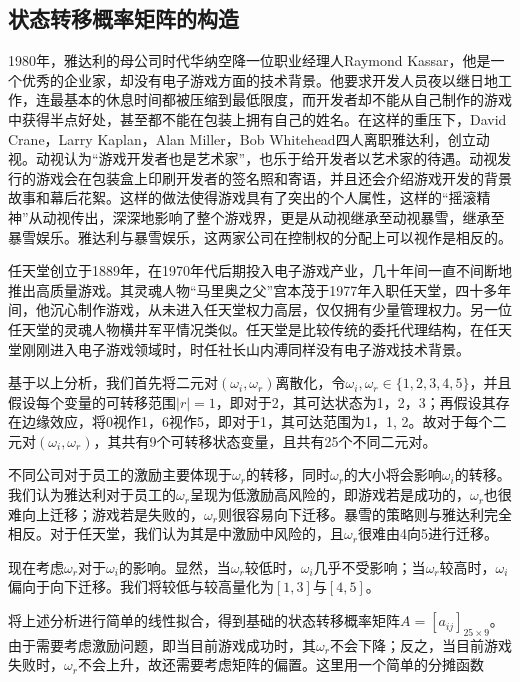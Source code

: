 \documentclass[hyperref]{ctexart}
\begin{document}
\begin{multicols}{2}
	\subsection{状态转移概率矩阵的构造}
    1980年，雅达利的母公司时代华纳空降一位职业经理人Raymond Kassar，他是一个优秀的企业家，却没有电子游戏方面的技术背景。他要求开发人员夜以继日地工作，连最基本的休息时间都被压缩到最低限度，而开发者却不能从自己制作的游戏中获得半点好处，甚至都不能在包装上拥有自己的姓名。在这样的重压下，David Crane，Larry Kaplan，Alan Miller，Bob Whitehead四人离职雅达利，创立动视。动视认为“游戏开发者也是艺术家”，也乐于给开发者以艺术家的待遇。动视发行的游戏会在包装盒上印刷开发者的签名照和寄语，并且还会介绍游戏开发的背景故事和幕后花絮。这样的做法使得游戏具有了突出的个人属性，这样的“摇滚精神”从动视传出，深深地影响了整个游戏界，更是从动视继承至动视暴雪，继承至暴雪娱乐。雅达利与暴雪娱乐，这两家公司在控制权的分配上可以视作是相反的。
    \par
    任天堂创立于1889年，在1970年代后期投入电子游戏产业，几十年间一直不间断地推出高质量游戏。其灵魂人物“马里奥之父”宫本茂于1977年入职任天堂，四十多年间，他沉心制作游戏，从未进入任天堂权力高层，仅仅拥有少量管理权力。另一位任天堂的灵魂人物横井军平情况类似。任天堂是比较传统的委托代理结构，在任天堂刚刚进入电子游戏领域时，时任社长山内溥同样没有电子游戏技术背景。
    \par
    基于以上分析，我们首先将二元对$(\omega_i, \omega_r)$离散化，令$\omega_i , \omega_r \in \{1,2,3,4,5\} $，并且假设每个变量的可转移范围$|r| = 1$，即对于2，其可达状态为1，2，3；再假设其存在边缘效应，将0视作1，6视作5，即对于1，其可达范围为1，1, 2。故对于每个二元对$(\omega_i, \omega_r)$，其共有9个可转移状态变量，且共有25个不同二元对。
    \par
    不同公司对于员工的激励主要体现于$\omega_r$的转移，同时$\omega_r$的大小将会影响$\omega_i$的转移。我们认为雅达利对于员工的$\omega_r$呈现为低激励高风险的，即游戏若是成功的，$\omega_r$也很难向上迁移；游戏若是失败的，$\omega_r$则很容易向下迁移。暴雪的策略则与雅达利完全相反。对于任天堂，我们认为其是中激励中风险的，且$\omega_r$很难由4向5进行迁移。
    \par
    现在考虑$\omega_r$对于$\omega_i$的影响。显然，当$\omega_r$较低时，$\omega_i$几乎不受影响；当$\omega_r$较高时，$\omega_i$偏向于向下迁移。我们将较低与较高量化为$[1, 3]$与$[4,5]$。
    \par
    将上述分析进行简单的线性拟合，得到基础的状态转移概率矩阵$A = [a_{ij}]_{25 \times 9}$。由于需要考虑激励问题，即当目前游戏成功时，其$\omega_r$不会下降；反之，当目前游戏失败时，$\omega_r$不会上升，故还需要考虑矩阵的偏置。这里用一个简单的分摊函数\par

\end{multicols}
\end{document}

